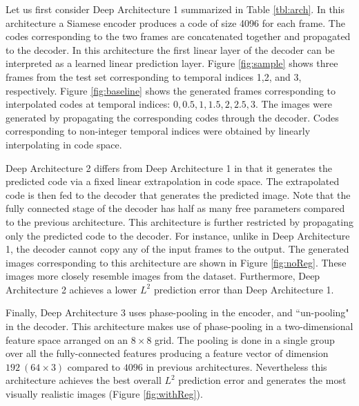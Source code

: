 \documentclass{article} %
\begin{document}
Let us first consider Deep Architecture 1 summarized in Table \ref{tbl:arch}. In this architecture a Siamese encoder produces a code of size 4096 for each frame. The codes corresponding to the two frames are concatenated together and propagated to the decoder. In this architecture the first linear layer of the decoder can be interpreted as a learned linear prediction layer. Figure \ref{fig:sample} shows three frames from the test set corresponding to temporal indices 1,2, and 3, respectively. Figure \ref{fig:baseline} shows the generated frames corresponding to interpolated codes at temporal indices: ${0,0.5,1,1.5,2,2.5,3}$. The images were generated by propagating the corresponding codes through the decoder. Codes corresponding to non-integer temporal indices were obtained by linearly interpolating in code space. 

Deep Architecture 2 differs from Deep Architecture 1 in that it generates the predicted code via a fixed linear extrapolation in code space. The extrapolated code is then fed to the decoder that generates the predicted image. Note that the fully connected stage of the decoder has half as many free parameters compared to the previous architecture. This architecture is further restricted by propagating only the predicted code to the decoder. For instance, unlike in Deep Architecture 1, the decoder cannot copy any of the input frames to the output. The generated images corresponding to this architecture are shown in Figure \ref{fig:noReg}. These images more closely resemble images from the dataset. Furthermore, Deep Architecture 2 achieves a lower $L^2$ prediction error than Deep Architecture 1. 

Finally, Deep Architecture 3 uses phase-pooling in the encoder, and ``un-pooling" in the decoder. This architecture makes use of phase-pooling in a two-dimensional feature space arranged on an $8\times8$ grid. The pooling is done in a single group over all the fully-connected features producing a feature vector of dimension $192~(64 \times 3 )$ compared to $4096$ in previous architectures. Nevertheless this architecture achieves the best overall $L^2$ prediction error and generates the most visually realistic images (Figure \ref{fig:withReg}). 
\end{document}
